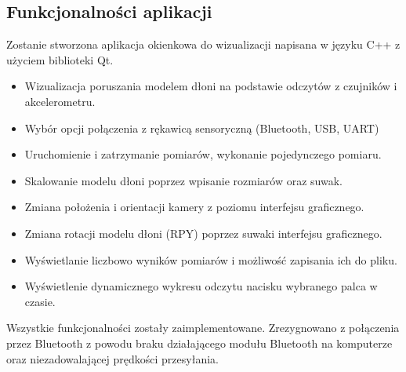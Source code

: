 \documentclass[10pt,a4paper]{article}
\begin{document}
\subsection{Funkcjonalności aplikacji}
Zostanie stworzona aplikacja okienkowa do wizualizacji napisana w języku C++ z użyciem biblioteki Qt.\\
\begin{itemize}
\item Wizualizacja poruszania modelem dłoni na podstawie odczytów z czujników i akcelerometru.
\item Wybór opcji połączenia z rękawicą sensoryczną (Bluetooth, USB, UART)
\item Uruchomienie i zatrzymanie pomiarów, wykonanie pojedynczego pomiaru.
\item Skalowanie modelu dłoni poprzez wpisanie rozmiarów oraz suwak.
\item Zmiana położenia i orientacji kamery z poziomu interfejsu graficznego.
\item Zmiana rotacji modelu dłoni (RPY) poprzez suwaki interfejsu graficznego.
\item Wyświetlanie liczbowo wyników pomiarów i możliwość zapisania ich do pliku.
\item Wyświetlenie dynamicznego wykresu odczytu nacisku wybranego palca w czasie.
\end{itemize}
Wszystkie funkcjonalności zostały zaimplementowane. Zrezygnowano z połączenia przez Bluetooth z powodu braku działającego modułu Bluetooth na komputerze oraz niezadowalającej prędkości przesyłania.

\newpage
\end{document}

